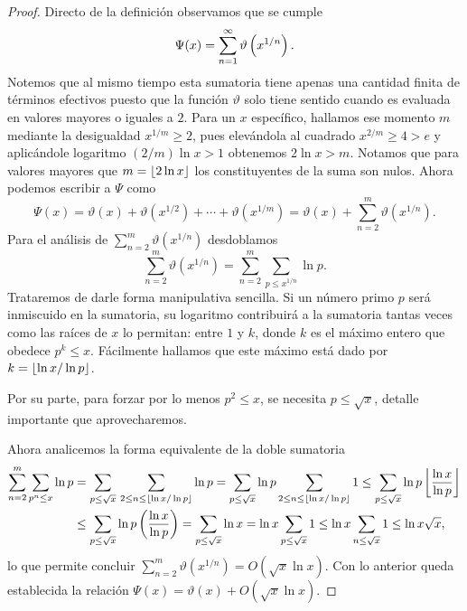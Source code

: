\begin{proof}
  Directo de la definici\'on observamos que se cumple 
  \[
    \Psi(x) = \sum_{n = 1}^\infty \vartheta\left( x^{1/n} \right).
  \]
  Notemos que al mismo tiempo esta sumatoria tiene apenas
  una cantidad finita de t\'erminos efectivos puesto que la funci\'on \(\vartheta\)
  solo tiene sentido cuando es evaluada en valores mayores o iguales a \(2\).
  Para un \(x\) espec\'ifico, hallamos ese momento \(m\) mediante la desigualdad
  \(x^{1/m} \geq 2\),
  pues elev\'andola al cuadrado
  \(x^{2/m} \geq 4 > e\)
  y aplic\'andole logaritmo
  \((2/m)\ln x > 1\)
  obtenemos
  \(2 \ln x > m\).
  Notamos que para valores mayores que
  \(m = \left\lfloor 2 \ln x \right\rfloor\) los constituyentes de la suma son nulos.
  Ahora podemos escribir a \(\Psi\) como 
  \[
    \Psi(x) = \vartheta(x) + \vartheta(x^{1/2}) + \cdots + \vartheta(x^{1/m})
    = \vartheta(x) + \sum_{n = 2}^m \vartheta(x^{1/n}).
  \]
  Para el an\'alisis de \(\sum_{n = 2}^m \vartheta(x^{1/n})\) desdoblamos
  \[
    \sum_{n = 2}^m \vartheta(x^{1/n})
    = \sum_{n = 2}^m \sum_{p \leq x^{1/n}} \ln p.
  \]
  Trataremos de darle forma manipulativa sencilla.
  Si un n\'umero primo \(p\) ser\'a inmiscuido en la sumatoria,
  su logaritmo contribuir\'a a la sumatoria tantas veces como las ra\'ices de \(x\) lo permitan:
  entre \(1\) y \(k\), donde \(k\) es el m\'aximo entero que obedece \(p^k \le x\).
  F\'acilmente hallamos que este m\'aximo est\'a dado por \(k = \left\lfloor \ln x / \ln p \right\rfloor\).
  
  Por su parte, para forzar por lo menos \(p^2 \le x\),
  se necesita \(p \le \sqrt{x}\), detalle importante que aprovecharemos.
  
  Ahora analicemos la forma equivalente de la doble sumatoria
  \begin{align*}
    \sum_{n = 2}^m \sum_{p^n \leq x} \ln p
    &= \sum_{p \leq \sqrt{x}} \, \sum_{2 \leq n \leq \left\lfloor \ln x / \ln p \right\rfloor} \ln p
    = \sum_{p \leq \sqrt{x}} \ln p \sum_{2 \leq n \leq \left\lfloor \ln x / \ln p \right\rfloor} 1
    \leq \sum_{p \leq \sqrt{x}} \ln p \left\lfloor \frac{\ln x}{\ln p} \right\rfloor \\
    &\leq \sum_{p \leq \sqrt{x}} \ln p \left( \frac{\ln x}{\ln p} \right)
    = \sum_{p \leq \sqrt{x}} \ln x
    = \ln x \sum_{p \leq \sqrt{x}} 1
    \leq \ln x \sum_{n \leq \sqrt{x}} 1
    \leq \ln x \sqrt{x}, 
  \end{align*}
  lo que permite concluir \(\sum_{n = 2}^m \vartheta(x^{1/n}) = O(\sqrt{x} \ln x)\).
  Con lo anterior queda establecida la relaci\'on \(\Psi(x) = \vartheta(x) + O(\sqrt{x} \ln x)\).
\end{proof}

